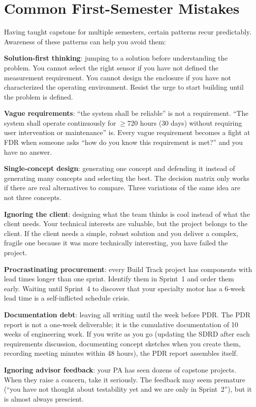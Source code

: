 \section{Common First-Semester Mistakes}
Having taught capstone for multiple semesters, certain patterns recur predictably. Awareness of these patterns can help you avoid them:

\textbf{Solution-first thinking}: jumping to a solution before understanding the problem. You cannot select the right sensor if you have not defined the measurement requirement. You cannot design the enclosure if you have not characterized the operating environment. Resist the urge to start building until the problem is defined.

\textbf{Vague requirements}: ``the system shall be reliable'' is not a requirement. ``The system shall operate continuously for $\geq$720 hours (30 days) without requiring user intervention or maintenance'' is. Every vague requirement becomes a fight at FDR when someone asks ``how do you know this requirement is met?'' and you have no answer.

\textbf{Single-concept design}: generating one concept and defending it instead of generating many concepts and selecting the best. The decision matrix only works if there are real alternatives to compare. Three variations of the same idea are not three concepts.

\textbf{Ignoring the client}: designing what the team thinks is cool instead of what the client needs. Your technical interests are valuable, but the project belongs to the client. If the client needs a simple, robust solution and you deliver a complex, fragile one because it was more technically interesting, you have failed the project.

\textbf{Procrastinating procurement}: every Build Track project has components with lead times longer than one sprint. Identify them in Sprint~1 and order them early. Waiting until Sprint~4 to discover that your specialty motor has a 6-week lead time is a self-inflicted schedule crisis.

\textbf{Documentation debt}: leaving all writing until the week before PDR. The PDR report is not a one-week deliverable; it is the cumulative documentation of 10 weeks of engineering work. If you write as you go (updating the SDRD after each requirements discussion, documenting concept sketches when you create them, recording meeting minutes within 48 hours), the PDR report assembles itself.

\textbf{Ignoring advisor feedback}: your PA has seen dozens of capstone projects. When they raise a concern, take it seriously. The feedback may seem premature (``you have not thought about testability yet and we are only in Sprint~2''), but it is almost always prescient.


